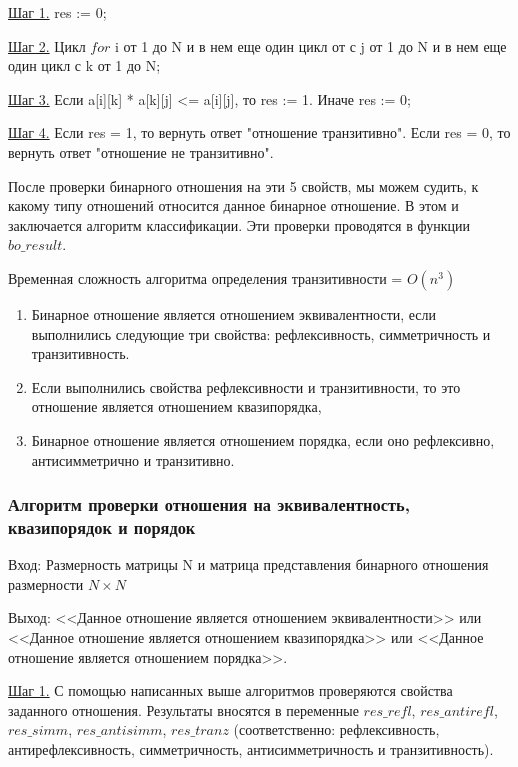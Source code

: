 \documentclass[bachelor, och, labwork]{shiza}
\begin{document}
	\underline{Шаг 1.} res := 0;
	
	\underline{Шаг 2.} Цикл $for$ i от 1 до N и в нем еще один цикл от с j от 1 до N и в нем еще один цикл с k от 1 до N;
	
	\underline{Шаг 3.} Если  a[i][k] * a[k][j] <= a[i][j], то res := 1. Иначе res := 0;
	
	\underline{Шаг 4.} Если res = 1, то вернуть ответ "отношение транзитивно". Если res = 0, то вернуть ответ "отношение не транзитивно".
	
	После проверки бинарного отношения на эти 5 свойств, мы можем судить, к какому типу отношений относится данное бинарное отношение. В этом  и заключается алгоритм классификации. Эти проверки проводятся в функции $bo\_result$.
	
	Временная сложность алгоритма определения транзитивности = $O(n^3)$
		
	\begin{enumerate}
		\item Бинарное отношение является отношением эквивалентности, если выполнились следующие три свойства: рефлексивность, симметричность и транзитивность.
		\item Если выполнились свойства рефлексивности и транзитивности, то это отношение является отношением квазипорядка,
		\item Бинарное отношение является отношением порядка, если оно рефлексивно, антисимметрично и транзитивно.
	\end{enumerate}	

	\subsubsection{Алгоритм проверки отношения на эквивалентность, квазипорядок и порядок}
	

	$\textit{Вход:}$ Размерность матрицы N и матрица представления бинарного отношения размерности $N \times N$
	
	$\textit{Выход:}$ <<Данное отношение является отношением эквивалентности>> или <<Данное отношение является отношением квазипорядка>> или <<Данное отношение является отношением порядка>>.
	
	\underline{Шаг 1.} С помощью написанных выше алгоритмов проверяются свойства заданного отношения. Результаты вносятся в переменные $res\_refl$, $res\_antirefl$, $res\_simm$, $res\_antisimm$, $res\_tranz$ (соответственно: рефлексивность, антирефлексивность, симметричность, антисимметричность и транзитивность).
	
\end{document}
